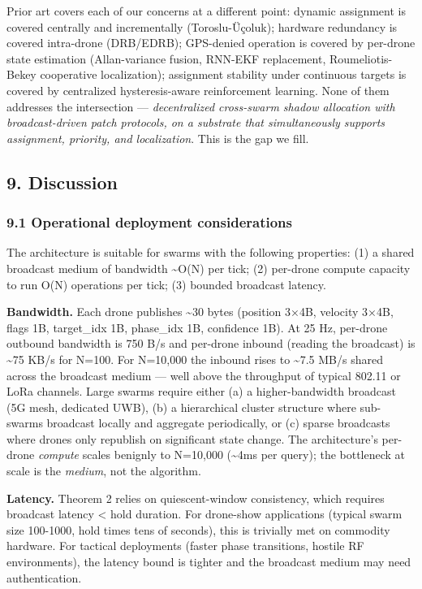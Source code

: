 Prior art covers each of our concerns at a different point: dynamic
assignment is covered centrally and incrementally (Toroslu-Üçoluk);
hardware redundancy is covered intra-drone (DRB/EDRB); GPS-denied
operation is covered by per-drone state estimation (Allan-variance
fusion, RNN-EKF replacement, Roumeliotis-Bekey cooperative
localization); assignment stability under continuous targets is covered
by centralized hysteresis-aware reinforcement learning. None of them
addresses the intersection --- \emph{decentralized cross-swarm shadow
allocation with broadcast-driven patch protocols, on a substrate that
simultaneously supports assignment, priority, and localization}. This is
the gap we fill.

\subsection{9. Discussion}\label{discussion}

\subsubsection{9.1 Operational deployment
considerations}\label{operational-deployment-considerations}

The architecture is suitable for swarms with the following properties:
(1) a shared broadcast medium of bandwidth \textasciitilde O(N) per
tick; (2) per-drone compute capacity to run O(N) operations per tick;
(3) bounded broadcast latency.

\textbf{Bandwidth.} Each drone publishes \textasciitilde30 bytes
(position 3×4B, velocity 3×4B, flags 1B, target\_idx 1B, phase\_idx 1B,
confidence 1B). At 25 Hz, per-drone outbound bandwidth is 750 B/s and
per-drone inbound (reading the broadcast) is \textasciitilde75 KB/s for
N=100. For N=10,000 the inbound rises to \textasciitilde7.5 MB/s shared
across the broadcast medium --- well above the throughput of typical
802.11 or LoRa channels. Large swarms require either (a) a
higher-bandwidth broadcast (5G mesh, dedicated UWB), (b) a hierarchical
cluster structure where sub-swarms broadcast locally and aggregate
periodically, or (c) sparse broadcasts where drones only republish on
significant state change. The architecture's per-drone \emph{compute}
scales benignly to N=10,000 (\textasciitilde4ms per query); the
bottleneck at scale is the \emph{medium}, not the algorithm.

\textbf{Latency.} Theorem 2 relies on quiescent-window consistency,
which requires broadcast latency \textless{} hold duration. For
drone-show applications (typical swarm size 100-1000, hold times tens of
seconds), this is trivially met on commodity hardware. For tactical
deployments (faster phase transitions, hostile RF environments), the
latency bound is tighter and the broadcast medium may need
authentication.

